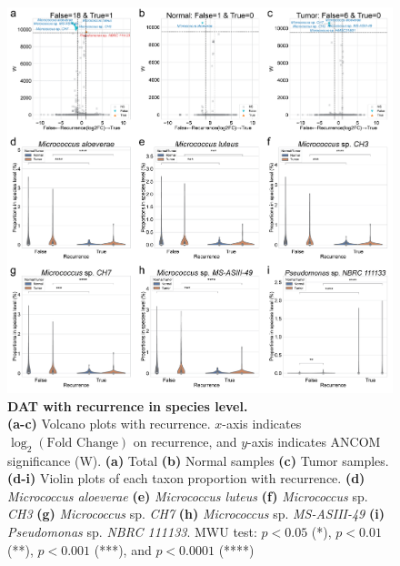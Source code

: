 \documentclass[11pt, a4paper, onecolumn, oneside]{report}
\begin{document}
            \begin{figure}[p]
                \centering
                \includegraphics[width=\linewidth]{Figures/CRC/Figure_08.png}
                \caption[DAT with recurrence in species level]{\textbf{DAT with recurrence in species level.}\\
                    \textbf{(a-c)} Volcano plots with recurrence. $x$-axis indicates $\log_2 (\textrm{Fold Change})$ on recurrence, and $y$-axis indicates ANCOM significance (W). \textbf{(a)} Total \textbf{(b)} Normal samples \textbf{(c)} Tumor samples. \textbf{(d-i)} Violin plots of each taxon proportion with recurrence. \textbf{(d)} \textit{Micrococcus aloeverae} \textbf{(e)} \textit{Micrococcus luteus} \textbf{(f)} \textit{Micrococcus} sp. \textit{CH3} \textbf{(g)} \textit{Micrococcus} sp. \textit{CH7} \textbf{(h)} \textit{Micrococcus} sp. \textit{MS-ASIII-49} \textbf{(i)} \textit{Pseudomonas} sp. \textit{NBRC 111133}. MWU test: $p < 0.05$ (*), $p < 0.01$ (**), $p < 0.001$ (***), and $p < 0.0001$ (****)}
                \label{fig:CRC-DAT-recurrence}
            \end{figure}
            \clearpage
\end{document}
